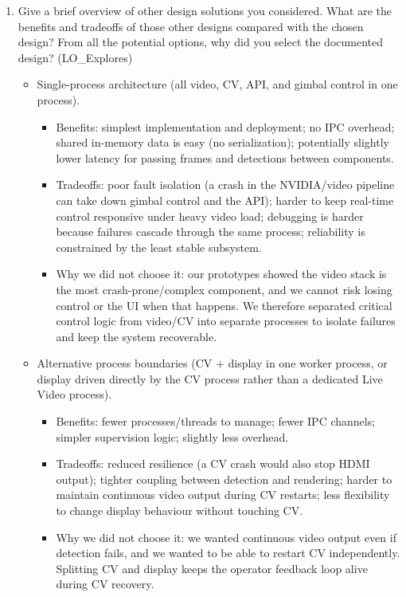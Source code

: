 \documentclass[12pt, titlepage]{article}
\begin{document}
\begin{enumerate}
  \item Give a brief overview of other design solutions you considered. What are the
        benefits and tradeoffs of those other designs compared with the chosen design?
        From all the potential options, why did you select the documented design?
        (LO\_Explores)
        \begin{itemize}
          \item Single-process architecture (all video, CV, API, and gimbal control in one
                process).
                \begin{itemize}
                  \item Benefits: simplest implementation and deployment; no IPC overhead; shared
                        in-memory data is easy (no serialization); potentially slightly lower latency
                        for passing frames and detections between components.
                  \item Tradeoffs: poor fault isolation (a crash in the NVIDIA/video pipeline can take
                        down gimbal control and the API); harder to keep real-time control responsive
                        under heavy video load; debugging is harder because failures cascade through
                        the same process; reliability is constrained by the least stable subsystem.
                  \item Why we did not choose it: our prototypes showed the video stack is the most
                        crash-prone/complex component, and we cannot risk losing control or the UI when
                        that happens. We therefore separated critical control logic from video/CV into
                        separate processes to isolate failures and keep the system recoverable.
                \end{itemize}

          \item Alternative process boundaries (CV + display in one worker process, or display
                driven directly by the CV process rather than a dedicated Live Video process).
                \begin{itemize}
                  \item Benefits: fewer processes/threads to manage; fewer IPC channels; simpler
                        supervision logic; slightly less overhead.
                  \item Tradeoffs: reduced resilience (a CV crash would also stop HDMI output); tighter
                        coupling between detection and rendering; harder to maintain continuous video
                        output during CV restarts; less flexibility to change display behaviour without
                        touching CV.
                  \item Why we did not choose it: we wanted continuous video output even if detection
                        fails, and we wanted to be able to restart CV independently. Splitting CV and
                        display keeps the operator feedback loop alive during CV recovery.
                \end{itemize}


\end{itemize}
\end{enumerate}
\end{document}
